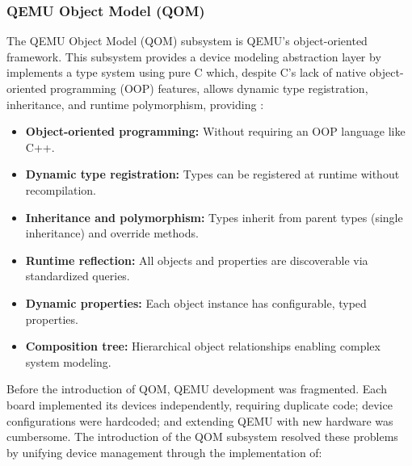 \subsubsection{QEMU Object Model (QOM)}
\label{chap:qemu_qom}

The QEMU Object Model (QOM) subsystem is QEMU's object-oriented framework. 
This subsystem provides a device modeling abstraction layer by implements a 
type system using pure C which, despite C's lack of native object-oriented programming 
(OOP) features, allows dynamic type registration, inheritance, and runtime 
polymorphism, providing\cite{Bellard2005Qemu} \cite{Qemu_QOM}:

\begin{itemize}
    \item \textbf{Object-oriented programming:    }Without requiring an OOP 
                                                    language like C++.

    \item \textbf{Dynamic type registration:      }Types can be registered at runtime without 
                                                    recompilation.
    
    \item \textbf{Inheritance and polymorphism:   }Types inherit from parent types (single 
                                                    inheritance) and override methods.
    
    \item \textbf{Runtime reflection:             }All objects and properties are 
                                                    discoverable via standardized queries.
    
    \item \textbf{Dynamic properties:             }Each object instance has configurable, 
                                                    typed properties.
    
    \item \textbf{Composition tree:               }Hierarchical object relationships enabling complex 
                                                    system modeling.
\end{itemize}

Before the introduction of QOM, QEMU development was fragmented. Each 
board implemented its devices independently, requiring duplicate code; device 
configurations were hardcoded; and extending QEMU with new hardware was cumbersome. 
The introduction of the QOM subsystem resolved these problems by unifying 
device management through the implementation of:

